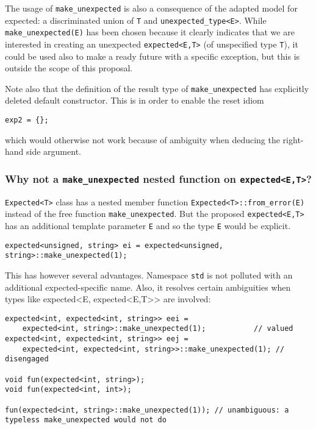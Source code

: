 \documentclass[a4paper,10pt]{article}
\newcommand{\cpp}[1]{\lstinline{#1}}
\begin{document}
The usage of \cpp{make_unexpected} is also a consequence of the adapted model for expected: a discriminated union of \cpp{T} and \cpp{unexpected_type<E>}. 
While \cpp{make_unexpected(E)} has been chosen because it clearly indicates that we are interested in creating an unexpected \cpp{expected<E,T>} (of unspecified type \cpp{T}), it could be used also to make a ready future with a specific exception, but this is outside the scope of this proposal.

Note also that the definition of the result type of \cpp{make_unexpected} has explicitly deleted default constructor. This is in order to enable the reset idiom 

\begin{lstlisting}
exp2 = {};
\end{lstlisting}

which would otherwise not work because of ambiguity when deducing the right-hand side argument.

\subsubsection{Why not a \cpp{make_unexpected} nested function on \cpp{expected<E,T>}?}

\cite{AlexandrescuExpected} \cpp{Expected<T>} class has a nested member function \cpp{Expected<T>::from_error(E)} instead of the free function \cpp{make_unexpected}. But the proposed \cpp{expected<E,T>} has an additional template parameter \cpp{E} and so the type \cpp{E} would be explicit.

\begin{lstlisting}
expected<unsigned, string> ei = expected<unsigned, string>::make_unexpected(1);
\end{lstlisting}

This has however several advantages. Namespace \cpp{std} is not polluted with an additional expected-specific name. Also, it resolves certain ambiguities when types like expected<E, expected<E,T>> are involved:

\begin{lstlisting}
expected<int, expected<int, string>> eei = 
    expected<int, string>::make_unexpected(1);           // valued
expected<int, expected<int, string>> eej = 
    expected<int, expected<int, string>>::make_unexpected(1); // disengaged

void fun(expected<int, string>);
void fun(expected<int, int>);

fun(expected<int, string>::make_unexpected(1)); // unambiguous: a typeless make_unexpected would not do 
\end{lstlisting}
\end{document}
